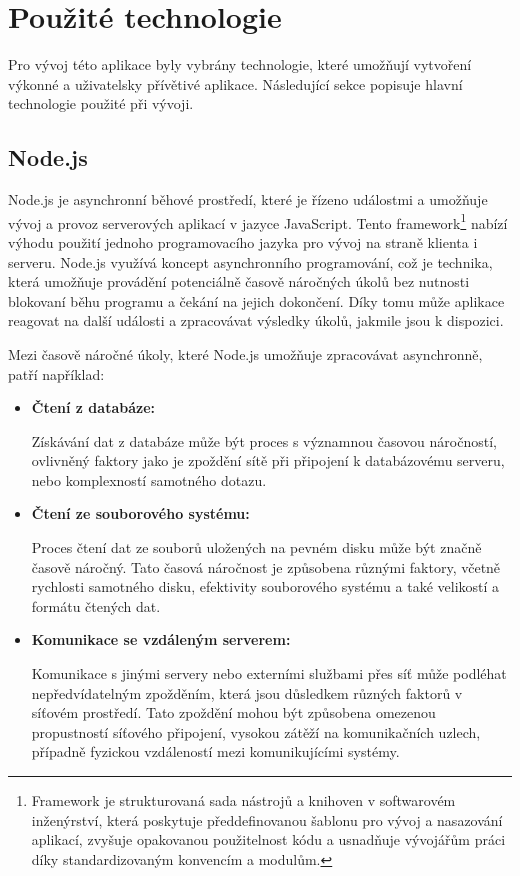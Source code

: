 \section{Použité technologie}
Pro vývoj této aplikace byly vybrány technologie, které umožňují vytvoření výkonné a uživatelsky přívětivé aplikace. Následující sekce popisuje hlavní technologie použité při vývoji.

\subsection{Node.js} 
Node.js je asynchronní běhové prostředí, které je řízeno událostmi a umožňuje vývoj a provoz serverových aplikací v jazyce JavaScript. Tento framework\footnote{Framework je strukturovaná sada nástrojů a knihoven v softwarovém inženýrství, která poskytuje předdefinovanou šablonu pro vývoj a nasazování aplikací, zvyšuje opakovanou použitelnost kódu a usnadňuje vývojářům práci díky standardizovaným konvencím a modulům.} nabízí výhodu použití jednoho programovacího jazyka pro vývoj na straně klienta i serveru. Node.js využívá koncept asynchronního programování, což je technika, která umožňuje provádění potenciálně časově náročných úkolů bez nutnosti blokovaní běhu programu a čekání na jejich dokončení. Díky tomu může aplikace reagovat na další události a zpracovávat výsledky úkolů, jakmile jsou k dispozici. \cite{Node.js}

Mezi časově náročné úkoly, které Node.js umožňuje zpracovávat asynchronně, patří například:

\begin{itemize}
  \item \textbf{Čtení z databáze:}
  
  Získávání dat z databáze může být proces s významnou časovou náročností, ovlivněný faktory jako je zpoždění sítě při připojení k databázovému serveru, nebo komplexností samotného dotazu. 

  \item \textbf{Čtení ze souborového systému:} 
  
  Proces čtení dat ze souborů uložených na pevném disku může být značně časově náročný. Tato časová náročnost je způsobena různými faktory, včetně rychlosti samotného disku, efektivity souborového systému a také velikostí a formátu čtených dat.

  \item \textbf{Komunikace se vzdáleným serverem:}
  
  Komunikace s jinými servery nebo externími službami přes síť může podléhat nepředvídatelným zpožděním, která jsou důsledkem různých faktorů v síťovém prostředí. Tato zpoždění mohou být způsobena omezenou propustností síťového připojení, vysokou zátěží na komunikačních uzlech, případně fyzickou vzdáleností mezi komunikujícími systémy. 
\end{itemize}

